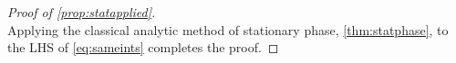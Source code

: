 \documentclass[
	fontsize=11pt, 
	twoside=false, 
	abstract=true, 
	a4paper,
]{scrartcl}
\newcommand{\eps}{\varepsilon}
\newcommand{\RR}{\mathbb{R}}
\newcommand{\CC}{\mathbb{C}}
\newcommand{\dd}{\mathrm{d}}
\newcommand{\td}[1]{\tilde{#1}}
\newcommand{\mf}[1]{\oldmathbb{#1}}
\newcommand{\bsc}[1]{\textbf{\ebgaramond\textsc{#1}}}
\begin{document}
\begin{proof}[Proof of \cref{prop:statapplied}]
\begin{equation*}
	\end{equation*}
	Applying the classical analytic method of stationary phase, \cref{thm:statphase}, to the LHS of \cref{eq:sameints} completes the proof.
%
%	
%
%
%
%

\end{proof}
\end{document}

